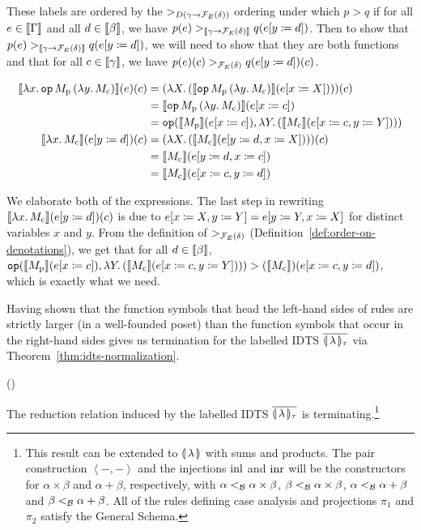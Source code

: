 These labels are ordered by the $>_{D(\gamma \to \mathcal{F}_E(\delta))}$ ordering
under which $p > q$ if for all $e \in \llbracket \Gamma \rrbracket$ and all
$d \in \llbracket \beta \rrbracket$, we have
$p(e) >_{\llbracket \gamma \to \mathcal{F}_E(\delta) \rrbracket} q(e[y \coloneqq d])$. Then to show
that $p(e) >_{\llbracket \gamma \to \mathcal{F}_E(\delta) \rrbracket} q(e[y \coloneqq d])$, we will
need to show that they are both functions and that for all
$c \in \llbracket \gamma \rrbracket$, we have
$p(e)(c) >_{\mathcal{F}_E(\delta)} q(e[y \coloneqq d])(c)$.

\begin{align*}
  \llbracket \lambda x.\, \mathtt{op}\,M_{\mathrm{p}}\,(\lambda y.\, M_{\mathrm{c}}) \rrbracket(e)(c)
  &= (\lambda X.\, (\llbracket \mathtt{op}\,M_{\mathrm{p}}\,(\lambda y.\, M_{\mathrm{c}}) \rrbracket(e[x \coloneqq X])))(c) \\
  &= \llbracket \mathtt{op}\,M_{\mathrm{p}}\,(\lambda y.\, M_{\mathrm{c}}) \rrbracket(e[x \coloneqq c]) \\
  &= \mathtt{op}(\llbracket M_{\mathrm{p}} \rrbracket(e[x \coloneqq c]), \lambda Y.\, (\llbracket M_{\mathrm{c}} \rrbracket(e[x \coloneqq c, y \coloneqq Y]))) \\
  \llbracket \lambda x.\, M_{\mathrm{c}} \rrbracket(e[y \coloneqq d])(c)
  &= (\lambda X.\, (\llbracket M_{\mathrm{c}} \rrbracket(e[y \coloneqq d, x \coloneqq X])))(c) \\
  &= \llbracket M_{\mathrm{c}} \rrbracket(e[y \coloneqq d, x \coloneqq c]) \\
  &= \llbracket M_{\mathrm{c}} \rrbracket(e[x \coloneqq c, y \coloneqq d])
\end{align*}

We elaborate both of the expressions. The last step in rewriting
$\llbracket \lambda x.\, M_{\mathrm{c}} \rrbracket(e[y \coloneqq d])(c)$ is due to
$e[x \coloneqq X, y \coloneqq Y] = e[y \coloneqq Y, x \coloneqq X]$ for distinct variables
$x$ and $y$. From the definition of $>_{\mathcal{F}_E(\delta)}$
(Definition~\ref{def:order-on-denotations}), we get that for all
$d \in \llbracket \beta \rrbracket$,
$\mathtt{op}(\llbracket M_{\mathrm{p}} \rrbracket(e[x \coloneqq c]),
\lambda Y.\, (\llbracket M_{\mathrm{c}} \rrbracket(e[x \coloneqq c, y \coloneqq Y]))) >
(\llbracket M_{\mathrm{c}} \rrbracket)(e[x \coloneqq c, y \coloneqq d])$, which is exactly what we need.

Having shown that the function symbols that head the left-hand sides of
rules are strictly larger (in a well-founded poset) than the function
symbols that occur in the right-hand sides gives us termination for the
labelled IDTS ${\overline{\llparenthesis \, \lambda \, \rrparenthesis_\tau}}$ via Theorem~\ref{thm:idts-normalization}.

\begin{theorem}\label{thm:labidts-termination}
  ()

  The reduction relation induced by the labelled IDTS ${\overline{\llparenthesis \, \lambda \, \rrparenthesis_\tau}}$ is
  terminating.\footnote{This result can be extended to $\llparenthesis \, \lambda \, \rrparenthesis$
    with sums and products. The pair construction $\left<-,-\right>$ and
    the injections $\operatorname{inl}$ and $\operatorname{inr}$ will be the constructors for
    $\alpha \times \beta$ and $\alpha + \beta$, respectively, with
    $\alpha <_{\mathcal{B}} \alpha \times \beta$, $\beta <_{\mathcal{B}} \alpha \times \beta$,
    $\alpha <_{\mathcal{B}} \alpha + \beta$ and $\beta <_{\mathcal{B}} \alpha + \beta$. All of
    the rules defining case analysis and projections $\pi_1$ and $\pi_2$
    satisfy the General Schema.}
\end{theorem}

